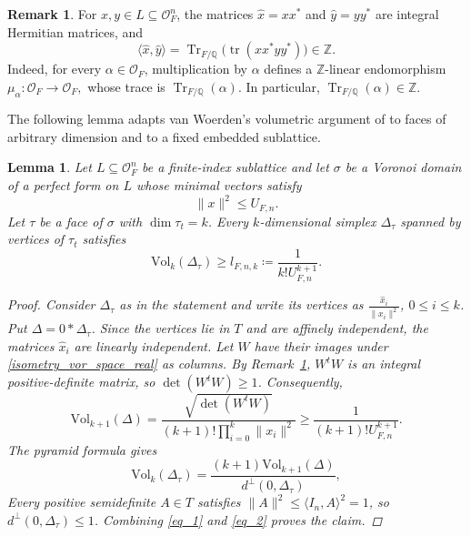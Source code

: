 \documentclass[11pt,a4paper,twoside]{amsart}
\theoremstyle{plain}
\newtheorem{lemma}[theorem]{\bfseries Lemma}
\theoremstyle{definition}
\newtheorem{remark}[theorem]{\bfseries Remark}
\newcommand{\rint}[0]{\mathcal{O}_F}
\newcommand{\vol}[0]{\mathrm{Vol}}
\newcommand{\tr}{\operatorname{Tr}}
\renewcommand{\leq}{\leqslant}
\renewcommand{\geq}{\geqslant}
\begin{document}
\begin{remark}\label{integral_Gram_mat}
For $x,y\in L\subseteq\rint^n$, the matrices $\hat x=xx^*$ and $\hat y=yy^*$ are integral Hermitian matrices, and
$$\langle\hat x,\hat y\rangle=\operatorname{Tr}_{F/\mathbb{Q}} \bigl(\operatorname{tr}(xx^*yy^*)\bigr)\in\mathbb Z.$$
Indeed, for every $\alpha\in\rint$, multiplication by $\alpha$ defines a $\mathbb Z$-linear endomorphism
$
\mu_\alpha:\rint\to\rint,
$
whose trace is $\operatorname{Tr}_{F/\mathbb{Q}}(\alpha)$. In particular,
$
\tr_{F/\mathbb{Q}}(\alpha)\in\mathbb Z.
$
\end{remark}
The following lemma adapts van Woerden's  volumetric argument of \cite[Corollary~3.4]{woerden} to faces of arbitrary dimension and to a fixed embedded sublattice.
\begin{lemma}
\label{inscribed_simplex}
Let $L\subseteq\rint^n$ be a finite-index sublattice and let $\sigma$ be a Voronoi domain of a perfect form on $L$ whose minimal vectors satisfy
\begin{equation}\label{norma_vertices}
\|x\|^2\leq U_{F,n}.
\end{equation}
Let $\tau$ be a face of $\sigma$ with $\dim\tau_t=k$. Every $k$-dimensional simplex $\Delta_\tau$ spanned by vertices of $\tau_t$ satisfies
$$\vol_k(\Delta_\tau)\geq l_{F,n,k}\coloneqq\frac{1}{k!U_{F,n}^{k+1}}.$$
\begin{proof}
Consider $\Delta_\tau$ as in the statement and write its vertices as $\frac{\hat x_i}{\|x_i\|^2}$, $0\leq i\leq k$. Put $\Delta=0*\Delta_\tau$. Since the vertices lie in $T$ and are affinely independent, the matrices $\hat x_i$ are linearly independent. Let $W$ have their images under \eqref{isometry_vor_space_real} as columns. By Remark~\ref{integral_Gram_mat}, $W^tW$ is an integral positive-definite matrix, so $\det(W^tW)\geq1$. Consequently,
\begin{equation}\label{eq_1}
\vol_{k+1}(\Delta)=\frac{\sqrt{\det(W^tW)}}{(k+1)!\prod_{i=0}^k\|x_i\|^2}\geq\frac{1}{(k+1)!U_{F,n}^{k+1}}.
\end{equation}
The pyramid formula gives
\begin{equation}\label{eq_2}
\vol_k(\Delta_\tau)=\frac{(k+1)\vol_{k+1}(\Delta)}{d^\perp(0,\Delta_\tau)},
\end{equation}
 Every positive semidefinite $A\in T$ satisfies $\|A\|^2\leq\langle I_n,A\rangle^2=1$, so $d^\perp(0,\Delta_\tau)\leq1$. Combining \eqref{eq_1} and \eqref{eq_2} proves the claim.
\end{proof}
\end{lemma}
\end{document}
